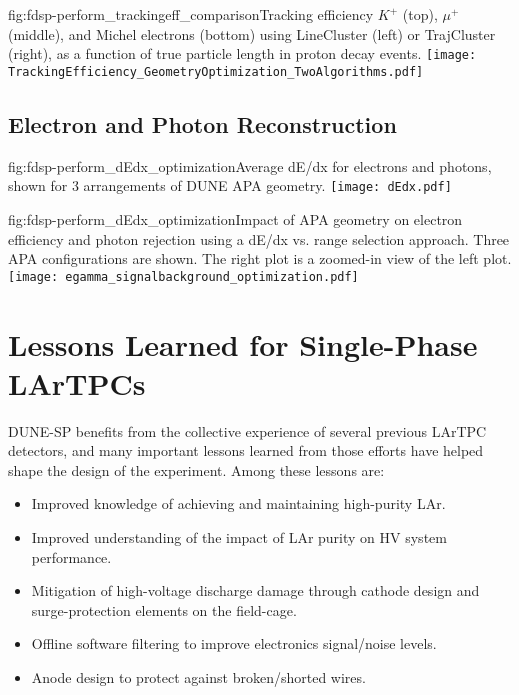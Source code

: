 \begin{dunefigure}{fig:fdsp-perform_trackingeff_comparison}{Tracking efficiency $K^+$ (top), $\mu^+$ (middle), and Michel electrons (bottom) using LineCluster (left) or TrajCluster (right), as a function of true particle length in proton decay events.}
\texttt{[image: TrackingEfficiency\_GeometryOptimization\_TwoAlgorithms.pdf]}
\end{dunefigure}

\subsection{Electron and Photon Reconstruction}
\label{sec:fdsp-perform-showerreco}

\begin{dunefigure}{fig:fdsp-perform_dEdx_optimization}{Average dE/dx for electrons and photons, shown for 3 arrangements of DUNE APA  geometry.}
\texttt{[image: dEdx.pdf]}
\end{dunefigure}

\begin{dunefigure}{fig:fdsp-perform_dEdx_optimization}{Impact of APA geometry on electron efficiency and photon rejection using a dE/dx vs. range selection approach.  Three APA configurations are shown.  The right plot is a zoomed-in view of the left plot.}
\texttt{[image: egamma\_signalbackground\_optimization.pdf]}
\end{dunefigure}


\section{Lessons Learned for Single-Phase LArTPCs}
\label{sec:fdsp-perform-lessons}

DUNE-SP benefits from the collective experience of several previous LArTPC detectors, and many important lessons learned from those efforts have helped shape the design of the experiment.  Among these lessons are:

\begin{itemize}
\item{Improved knowledge of achieving and maintaining high-purity LAr.}
\item{Improved understanding of the impact of LAr purity on HV system performance.}
\item{Mitigation of high-voltage discharge damage through cathode design and surge-protection elements on the field-cage.}
\item{Offline software filtering to improve electronics signal/noise levels.}
\item{Anode design to protect against broken/shorted wires.}
\end{itemize}

